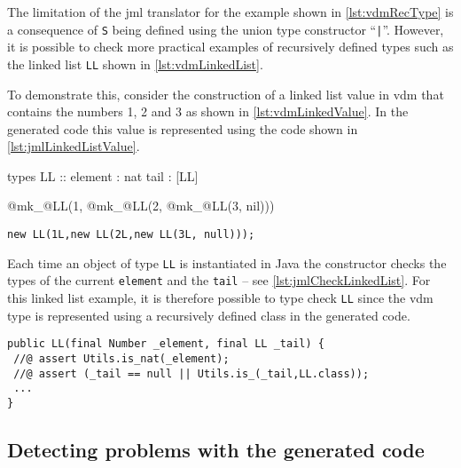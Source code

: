 The limitation of the \ac{jml} translator for the example shown in
\autoref{lst:vdmRecType} is a consequence of \texttt{S} being defined
using the union type constructor ``\texttt{|}''. However, it is
possible to check more practical examples of recursively defined types
such as the linked list \texttt{LL} shown in
\autoref{lst:vdmLinkedList}.

To demonstrate this, consider the construction of a linked list value
in \ac{vdm} that contains the numbers 1, 2 and 3 as shown in
\autoref{lst:vdmLinkedValue}. In the generated code this value is
represented using the code shown in \autoref{lst:jmlLinkedListValue}.

\begin{vdmsl}[style=customVdm,caption={Example of a linked list
defined using a record type.},label={lst:vdmLinkedList}]
types
LL ::
  element : nat
  tail : [LL]
\end{vdmsl}

\begin{vdmsl}[style=customVdm,caption={Example of a linked list value
in \ac{vdm}.},label={lst:vdmLinkedValue},numbers=none]
@mk_@LL(1, @mk_@LL(2, @mk_@LL(3, nil)))
\end{vdmsl}

\begin{lstlisting}[style=customJml,caption={Example of a linked list
value in Java.},label={lst:jmlLinkedListValue},numbers=none]
new LL(1L,new LL(2L,new LL(3L, null)));
\end{lstlisting}

Each time an object of type \texttt{LL} is instantiated in Java the
constructor checks the types of the current \texttt{element} and the
\texttt{tail} -- see \autoref{lst:jmlCheckLinkedList}. For this linked
list example, it is therefore possible to type check \texttt{LL} since
the \ac{vdm} type is represented using a recursively defined class in
the generated code.

\begin{lstlisting}[style=customJml,caption={Type checking a linked list using \ac{jml}.},label={lst:jmlCheckLinkedList}]
public LL(final Number _element, final LL _tail) {
 //@ assert Utils.is_nat(_element);
 //@ assert (_tail == null || Utils.is_(_tail,LL.class));
 ...
} 
\end{lstlisting}

\subsection{Detecting problems with the generated code}
\label{sec:detect-problem}

